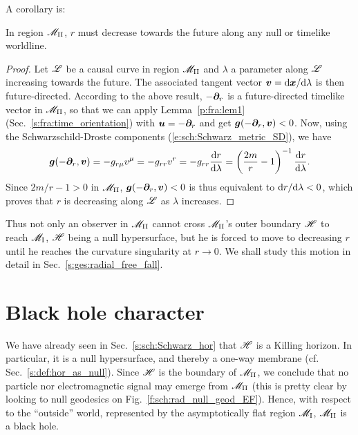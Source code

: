 A corollary is:
\begin{prop}
\label{p:sch:r_decreasing}
In region $\mathscr{M}_{\rm II}$, $r$ must decrease towards the future
along any null or timelike worldline.
\end{prop}
\begin{proof}
Let $\mathscr{L}$ be a causal curve in region $\mathscr{M}_{\rm II}$ and $\lambda$ a parameter
along $\mathscr{L}$ increasing towards the future.
The associated tangent vector
$\bm{v} = \mathrm{d}\bm{x}/\mathrm{d}\lambda$ is then future-directed.
According to the above result, $-\bm{\partial}_r$ is a future-directed timelike vector
in $\mathscr{M}_{\rm II}$, so that we can apply Lemma~\ref{p:fra:lem1} (Sec.~\ref{s:fra:time_orientation})
with $\bm{u} = - \bm{\partial}_r$ and get $\bm{g}(-\bm{\partial}_r, \bm{v}) < 0$.
Now, using the Schwarzschild-Droste
components (\ref{e:sch:Schwarz_metric_SD}), we have
\[
    \bm{g}(-\bm{\partial}_r, \bm{v}) = - g_{r\mu} v^\mu = - g_{rr} v^r = - g_{rr} \frac{\mathrm{d} r}{\mathrm{d} \lambda}
    = \left(\frac{2m}{r} - 1 \right)^{-1} \frac{\mathrm{d} r}{\mathrm{d} \lambda} .
\]
Since $2m/r - 1 > 0$ in $\mathscr{M}_{\rm II}$, $\bm{g}(-\bm{\partial}_r, \bm{v}) < 0$
is thus equivalent to $\mathrm{d} r/ \mathrm{d}\lambda < 0$, which proves that $r$ is decreasing
along $\mathscr{L}$ as $\lambda$ increases.
\end{proof}
Thus not only an observer in $\mathscr{M}_{\rm II}$ cannot cross $\mathscr{M}_{\rm II}$'s outer boundary
$\mathscr{H}$ to reach $\mathscr{M}_{\rm I}$, $\mathscr{H}$ being a null hypersurface, but he is forced
to move to decreasing $r$ until he reaches the curvature singularity at $r\rightarrow 0$.
We shall study this motion in detail in Sec.~\ref{s:ges:radial_free_fall}.



\section{Black hole character} \label{s:sch:BH}

We have already seen in Sec.~\ref{s:sch:Schwarz_hor} that $\mathscr{H}$ is
a Killing horizon. In particular, it is a null hypersurface, and thereby a
one-way membrane (cf. Sec.~\ref{s:def:hor_as_null}).
Since $\mathscr{H}$ is the boundary of $\mathscr{M}_{\rm II}$, we conclude that no particle nor
electromagnetic signal may emerge from $\mathscr{M}_{\rm II}$
(this is pretty clear by looking to null geodesics on
Fig.~\ref{f:sch:rad_null_geod_EF}). Hence, with respect to the ``outside''
world, represented by the asymptotically flat region $\mathscr{M}_{\rm I}$,
$\mathscr{M}_{\rm II}$ is a black hole.

